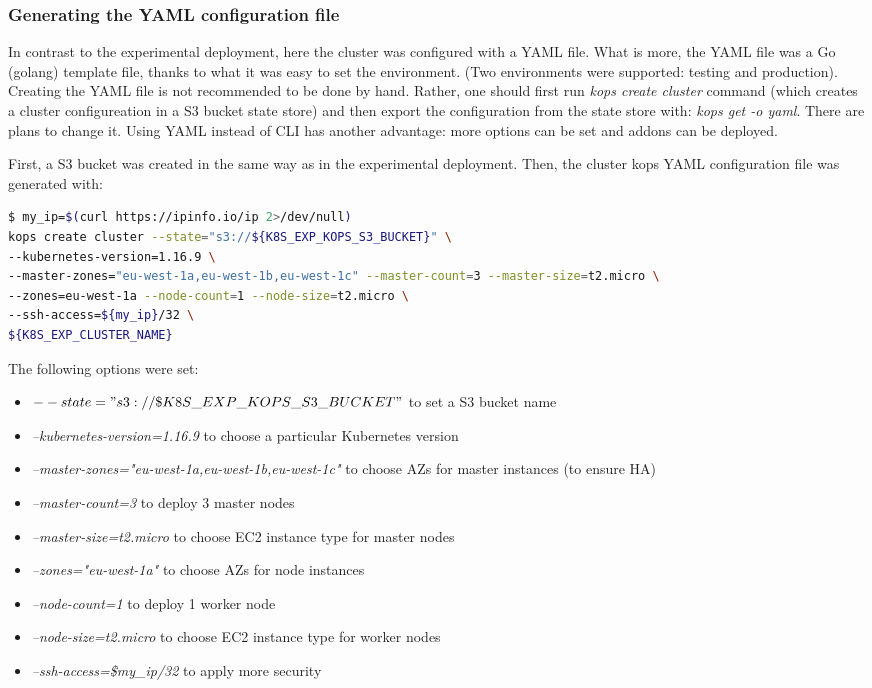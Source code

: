 \subsubsection{Generating the YAML configuration file}
In contrast to the experimental deployment, here the cluster was configured with a YAML file. What is more, the YAML file was a Go (golang) template file\cite{online-kops-ct}, thanks to what it was easy to set the environment. (Two environments were supported: testing and production). Creating the YAML file is not recommended to be done by hand. Rather, one should first run \textit{kops create cluster} command (which creates a cluster configureation in a S3 bucket state store) and then export the configuration from the state store with: \textit{kops get -o yaml}. There are plans to change it. Using YAML instead of CLI has another advantage: more options can be set\cite{online-kops-manifest} and addons can be deployed\cite{online-kops-addons}.

First, a S3 bucket was created in the same way as in the experimental deployment. Then, the cluster kops YAML configuration file was generated with:
\begin{lstlisting}[basicstyle=\tiny,caption={Commands used to generate a cluster configuration with kops},captionpos=b,language=Bash,xleftmargin=1cm]
$ my_ip=$(curl https://ipinfo.io/ip 2>/dev/null)
kops create cluster --state="s3://${K8S_EXP_KOPS_S3_BUCKET}" \
--kubernetes-version=1.16.9 \
--master-zones="eu-west-1a,eu-west-1b,eu-west-1c" --master-count=3 --master-size=t2.micro \
--zones=eu-west-1a --node-count=1 --node-size=t2.micro \
--ssh-access=${my_ip}/32 \
${K8S_EXP_CLUSTER_NAME}
\end{lstlisting}

The following options were set:
\begin{itemize}
\item \textit{$--state="s3://\${K8S\_EXP\_KOPS\_S3\_BUCKET}"$} to set a S3 bucket name
\item \textit{--kubernetes-version=1.16.9} to choose a particular Kubernetes version
\item \textit{--master-zones="eu-west-1a,eu-west-1b,eu-west-1c"} to choose AZs for master instances (to ensure HA)
\item \textit{--master-count=3} to deploy 3 master nodes
\item \textit{--master-size=t2.micro} to choose EC2 instance type for master nodes
\item \textit{--zones="eu-west-1a"} to choose AZs for node instances
\item \textit{--node-count=1} to deploy 1 worker node
\item \textit{--node-size=t2.micro} to choose EC2 instance type for worker nodes
\item \textit{--ssh-access=\${my\_ip}/32} to apply more security
\end{itemize}

